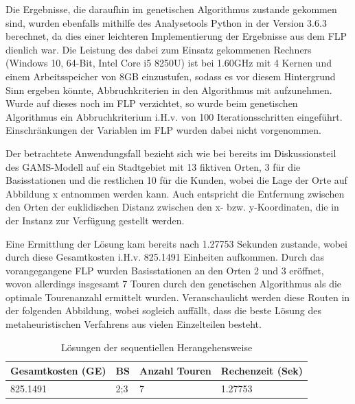 \documentclass[a4paper,12pt,parskip,bibtotoc,liststotoc]{article}
\begin{document}
Die Ergebnisse, die daraufhin im genetischen Algorithmus zustande gekommen sind, wurden ebenfalls mithilfe des Analysetools Python in der Version 3.6.3 berechnet, da dies einer leichteren Implementierung der Ergebnisse aus dem FLP dienlich war.
Die Leistung des dabei zum Einsatz gekommenen Rechners (Windows 10, 64-Bit, Intel Core i5 8250U) ist bei 1.60GHz mit 4 Kernen und einem Arbeitsspeicher von 8GB einzustufen, sodass es vor diesem Hintergrund Sinn ergeben könnte, Abbruchkriterien in den Algorithmus mit aufzunehmen.
Wurde auf dieses noch im FLP verzichtet, so wurde beim genetischen Algorithmus ein Abbruchkriterium i.H.v. von 100 Iterationsschritten eingeführt.
Einschränkungen der Variablen im FLP wurden dabei nicht vorgenommen.

Der betrachtete Anwendungsfall bezieht sich wie bei bereits im Diskussionsteil des GAMS-Modell auf ein Stadtgebiet mit 13 fiktiven Orten, 3 für die Basisstationen und die restlichen 10 für die Kunden, wobei die Lage der Orte auf Abbildung x entnommen werden kann.
Auch entspricht die Entfernung zwischen den Orten der euklidischen Distanz zwischen den x- bzw. y-Koordinaten, die in der Instanz zur Verfügung gestellt werden.

Eine Ermittlung der Lösung kam bereits nach 1.27753 Sekunden zustande, wobei durch diese Gesamtkosten i.H.v. 825.1491 Einheiten aufkommen.
Durch das vorangegangene FLP wurden Basisstationen an den Orten 2 und 3 eröffnet, wovon allerdings insgesamt 7 Touren durch den genetischen Algorithmus als die optimale Tourenanzahl ermittelt wurden.
Veranschaulicht werden diese Routen in der folgenden Abbildung, wobei sogleich auffällt, dass die beste Lösung des metaheuristischen Verfahrens aus vielen Einzelteilen besteht.  



\begin{table}[h!]
    \vspace*{-3mm}
    \hspace*{2mm}
  \renewcommand{\arraystretch}{1,5}
  \caption{Lösungen der sequentiellen Herangehensweise
  }
  \begin{center}
 
    \begin{tabular}{|l|l|l|l|} \hline
    \textbf{Gesamtkosten (GE)} &\textbf{BS} &\textbf{Anzahl Touren}&\textbf{ Rechenzeit} (Sek)\\\hline
     825.1491 & 2;3 & 7 & 1.27753\\\hline   
	\end{tabular}
	  \end{center}
\end{table}
\end{document}
